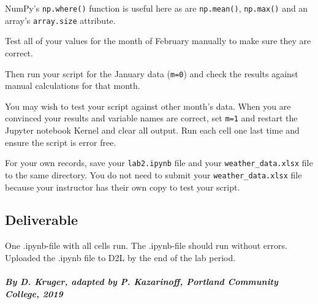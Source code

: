 \documentclass[11pt]{article}
\begin{document}
NumPy's \texttt{np.where()} function is useful here as are
\texttt{np.mean()}, \texttt{np.max()} and an array's \texttt{array.size}
attribute.

    Test all of your values for the month of February manually to make sure
they are correct.

Then run your script for the January data (\texttt{m=0}) and check the
results against manual calculations for that month.

You may wish to test your script against other month's data. When you
are convinced your results and variable names are correct, set
\texttt{m=1} and restart the Jupyter notebook Kernel and clear all
output. Run each cell one last time and ensure the script is error free.

For your own records, save your \texttt{lab2.ipynb} file and your
\texttt{weather\_data.xlsx} file to the same directory. You do not need
to submit your \texttt{weather\_data.xlsx} file because your instructor
has their own copy to test your script.

    \hypertarget{deliverable}{%
\subsection{Deliverable}\label{deliverable}}

One .ipynb-file with all cells run. The .ipynb-file should run without
errors. Uploaded the .ipynb file to D2L by the end of the lab period.

    \hypertarget{by-d.-kruger-adapted-by-p.-kazarinoff-portland-community-college-2019}{%
\paragraph{\texorpdfstring{\emph{By D. Kruger, adapted by P. Kazarinoff,
Portland Community College,
2019}}{By D. Kruger, adapted by P. Kazarinoff, Portland Community College, 2019}}\label{by-d.-kruger-adapted-by-p.-kazarinoff-portland-community-college-2019}}


    
    
    
    
\end{document}
